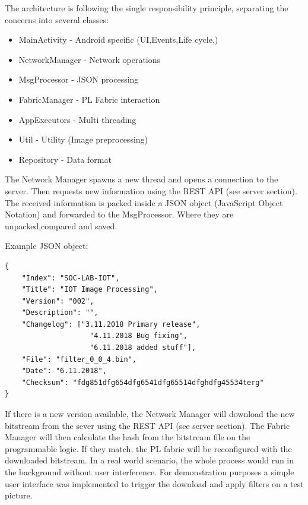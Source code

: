 The architecture is following the single responsibility principle, separating the concerns into several classes:

\begin{itemize}
    \item MainActivity 	    - Android specific (UI,Events,Life cycle,)
    \item NetworkManager	- Network operations 
    \item MsgProcessor	    - JSON processing 
    \item FabricManager	    - PL Fabric interaction
    \item AppExecutors	    - Multi threading
    \item Util			    - Utility (Image preprocessing)
    \item Repository        - Data format
\end{itemize}


The Network Manager spawns a new thread and opens a connection to the server. Then requests new information using the REST API (see server section). The received information is packed inside a JSON object (JavaScript Object Notation) and forwarded to the MsgProcessor. Where they are unpacked,compared and saved.

Example JSON object:
\begin{verbatim}
{
    "Index": "SOC-LAB-IOT",
    "Title": "IOT Image Processing",
    "Version": "002",
    "Description": "",
    "Changelog": ["3.11.2018 Primary release", 
                    "4.11.2018 Bug fixing", 
                    "6.11.2018 added stuff"],
    "File": "filter_0_0_4.bin",
    "Date": "6.11.2018",
    "Checksum": "fdg851dfg654dfg6541dfg65514dfghdfg45534terg"
}  
\end{verbatim}



If there is a new version available, the Network Manager will download the new bitstream from the sever using the REST API (see server section). The Fabric Manager will then calculate the hash from the bitstream file on the programmable logic. If they match, the PL fabric will be reconfigured with the downloaded bitstream. In a real world scenario, the whole process would run in the background without user interference. For demonstration purposes a simple user interface was implemented to trigger the download and apply filters on a test picture.

